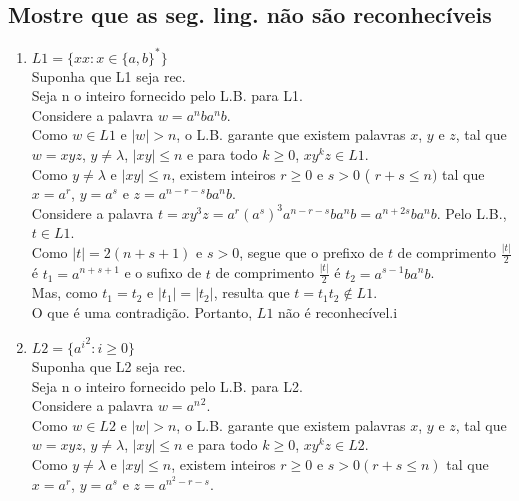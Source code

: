 \documentclass{article}
\begin{document}
\subsection{Mostre que as seg. ling. não são reconhecíveis}
    \begin{enumerate}
        \item $ L1 = \{xx: x \in \{a,b\}^* \} $\\
                Suponha que L1 seja rec.\\
                Seja n o inteiro fornecido pelo L.B. para L1.\\
                Considere a palavra $w = a^nba^nb $.\\
                Como $ w \in L1 $ e $ |w| > n $, o L.B. garante que existem palavras $x$, $y$ e $z$, tal que $ w = xyz $, $ y \neq \lambda $, $ |xy| \leq n $ e para todo $ k \geq 0 $, $ xy^kz \in L1 $.\\
                Como $ y \neq \lambda $ e $ |xy| \leq n $, existem inteiros $ r \geq 0 $ e $ s > 0 $ ( $ r + s \leq n ) $ tal que $ x = a^r $, $ y = a^s $ e $ z = a^{n-r-s}ba^nb $.\\
                Considere a palavra $ t = xy^3z = a^r(a^s)^3a^{n-r-s}ba^nb = a^{n+2s}ba^nb.$ Pelo L.B., $ t \in L1$.\\
                Como $ |t| = 2(n+s+1) $ e $ s > 0 $, segue que o prefixo de $ t $ de comprimento $ \frac{|t|}{2} $ é $t_1 = a^{n+s+1} $ e o sufixo de $ t $ de comprimento $ \frac{|t|}{2} $ é $ t_2 = a^{s-1}ba^nb$.\\
                Mas, como $ t_1 = t_2 $ e $ |t_1| = |t_2| $, resulta que $ t = t_1t_2 \notin L1 $.\\
                O que é uma contradição. Portanto, $ L1 $ não é reconhecível.i
        \item $ L2 = \{ {a^i}^2 : i \geq 0 \} $ \\
                Suponha que L2 seja rec.\\
                Seja n o inteiro fornecido pelo L.B. para L2.\\
                Considere a palavra $w = {a^n}^2 $. \\
                Como $ w \in L2 $ e $ |w| > n $,  o L.B. garante que existem palavras $x$, $y$ e $z$, tal que $ w = xyz $, $ y \neq \lambda $, $ |xy| \leq n $ e para todo $ k \geq 0 $, $ xy^kz \in L2 $.\\
                Como $ y \neq \lambda $ e $ |xy| \leq n $, existem inteiros $ r \geq 0 $ e $s > 0 (r+s \leq n)$ tal que $ x = a^r $, $ y = a^s $ e $ z = a^{n^2-r-s} $.\\

\end{enumerate}
\end{document}
